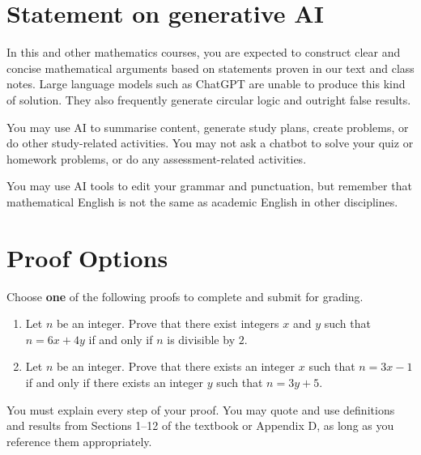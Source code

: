 \documentclass{article}
\theoremstyle{definition}
\begin{document}
\vfill

\section*{Statement on generative AI}

In this and other mathematics courses, you are expected to construct clear and concise mathematical arguments based on statements proven in our text and class notes. Large language models such as ChatGPT are unable to produce this kind of solution. They also frequently generate circular logic and outright false results.
 
You may use AI to summarise content, generate study plans, create problems, or do other study-related activities. You may not ask a chatbot to solve your quiz or homework problems, or do any assessment-related activities.
 
You may use AI tools to edit your grammar and punctuation, but remember that mathematical English is not the same as academic English in other disciplines. 

\vfill

\newpage


\section*{Proof Options}

Choose \textbf{one} of the following proofs to complete and submit for grading.

\begin{enumerate}
    \item Let $n$ be an integer. Prove that there exist integers $x$ and $y$ such that $n=6x+4y$ if and only if $n$ is divisible by $2$.
    \item Let $n$ be an integer. Prove that there exists an integer $x$ such that $n=3x-1$ if and only if there exists an integer $y$ such that $n=3y+5$.
\end{enumerate}

\noindent You must explain every step of your proof. You may quote and use definitions and results from Sections 1--12 of the textbook or Appendix D, as long as you reference them appropriately.

\end{document}

